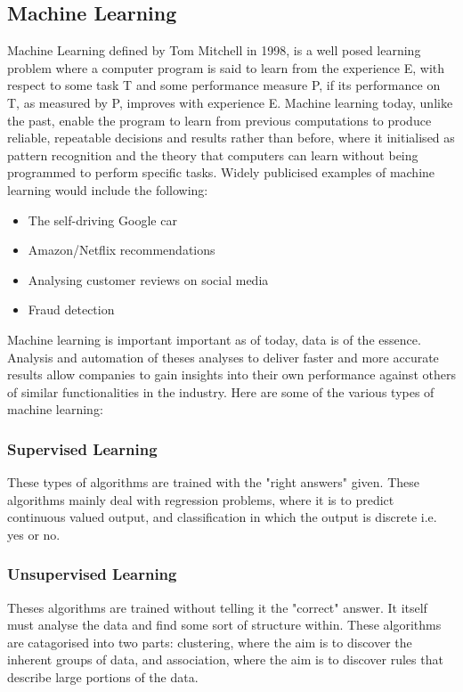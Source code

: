 \documentclass[a4paper]{article}
\begin{document}
{\subsection{Machine Learning}
Machine Learning defined by Tom Mitchell in 1998, is a well posed learning problem where a computer program is said to learn from the experience E, with respect to some task T and some performance measure P, if its performance on T, as measured by P, improves with experience E.\autocite{R11}
\bigbreak
Machine learning today, unlike the past, enable the program to learn from previous computations to produce reliable, repeatable decisions and results rather than before, where it initialised as pattern recognition and the theory that computers can learn without being programmed to perform specific tasks.\autocite{R10} Widely publicised examples of machine learning would include the following:
\begin{itemize}
    \item The self-driving Google car
    \item Amazon/Netflix recommendations
    \item Analysing customer reviews on social media
    \item Fraud detection
\end{itemize}
\bigbreak
Machine learning is important important as of today, data is of the essence. Analysis and automation of theses analyses to deliver faster and more accurate results allow companies to gain insights into their own performance against others of similar functionalities in the industry.
\bigbreak
Here are some of the various types of machine learning:
\subsubsection{Supervised Learning}
These types of algorithms are trained with the "right answers" given. These algorithms mainly deal with regression problems, where it is to predict continuous valued output, and classification in which the output is discrete i.e. yes or no.
\subsubsection{Unsupervised Learning}
Theses algorithms are trained without telling it the "correct" answer. It itself must analyse the data and find some sort of structure within. These algorithms are catagorised into two parts: clustering, where the aim is to discover the inherent groups of data, and association, where the aim is to discover rules that describe large portions of the data.
}
\end{document}
